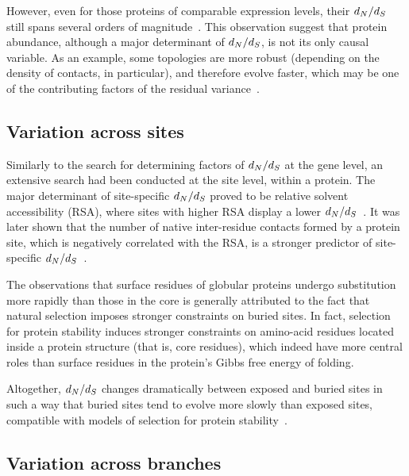 However, even for those proteins of comparable expression levels, their $d_N / d_S$ still spans several orders of magnitude~\citep{Drummond2008}.
This observation suggest that protein abundance, although a major determinant of $d_N / d_S$, is not its only causal variable.
As an example, some topologies are more robust (depending on the density of contacts, in particular), and therefore evolve faster, which may be one of the contributing factors of the residual variance~\citep{Echave2017}.

\subsection{Variation across sites}
\label{subsec:thermo-variation-across-sites}

Similarly to the search for determining factors of $d_N / d_S$ at the gene level, an extensive search had been conducted at the site level, within a protein.
The major determinant of site-specific $d_N / d_S$ proved to be relative solvent accessibility (RSA), where sites with higher RSA display a lower $d_N / d_S$~\citep{Ramsey2011}.
It was later shown that the number of native inter-residue contacts formed by a protein site, which is negatively correlated with the RSA, is a stronger predictor of site-specific $d_N / d_S$~\citep{Yeh2013}.

The observations that surface residues of globular proteins undergo \gls{substitution} more rapidly than those in the core is generally attributed to the fact that natural selection imposes stronger constraints on buried sites.
In fact, selection for protein stability induces stronger constraints on amino-acid residues located inside a protein structure (that is, core residues), which indeed have more central roles than surface residues in the protein's Gibbs free energy of folding.

Altogether, $d_N / d_S$ changes dramatically between exposed and buried sites in such a way that buried sites tend to evolve more slowly than exposed sites, compatible with models of selection for protein stability~\citep{Echave2016}.

\subsection{Variation across branches}
\label{subsec:thermo-variation-across-branches}

